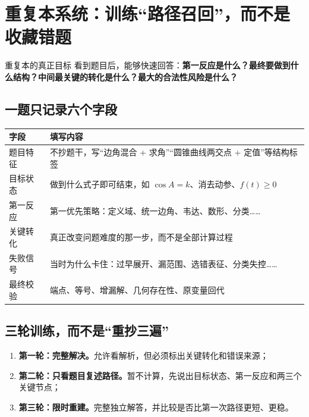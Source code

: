 \documentclass[11pt,a4paper]{ctexart}
\begin{document}
\newpage

\section{重复本系统：训练“路径召回”，而不是收藏错题}

\begin{keybox}{重复本的真正目标}
看到题目后，能够快速回答：\textbf{第一反应是什么？最终要做到什么结构？中间最关键的转化是什么？最大的合法性风险是什么？}
\end{keybox}

\subsection{一题只记录六个字段}
\begin{center}
\begin{tabularx}{0.96\textwidth}{p{2.6cm}X}
\toprule
\textbf{字段} & \textbf{填写内容}\\
\midrule
题目特征 & 不抄题干，写“边角混合 + 求角”“圆锥曲线两交点 + 定值”等结构标签\\ \hline
目标状态 & 做到什么式子即可结束，如 $\cos A=k$、消去动参、$f(t)\ge0$\\ \hline
第一反应 & 第一优先策略：定义域、统一边角、韦达、数形、分类……\\ \hline
关键转化 & 真正改变问题难度的那一步，而不是全部计算过程\\ \hline
失败信号 & 当时为什么卡住：过早展开、漏范围、选错表征、分类失控……\\ \hline
最终校验 & 端点、等号、增漏解、几何存在性、原变量回代\\
\bottomrule
\end{tabularx}
\end{center}

\subsection{三轮训练，而不是“重抄三遍”}
\begin{enumerate}
  \item \textbf{第一轮：完整解决。}允许看解析，但必须标出关键转化和错误来源；
  \item \textbf{第二轮：只看题目复述路径。}暂不计算，先说出目标状态、第一反应和两三个关键节点；
  \item \textbf{第三轮：限时重建。}完整独立解答，并比较是否比第一次路径更短、更稳。
\end{enumerate}
\end{document}
